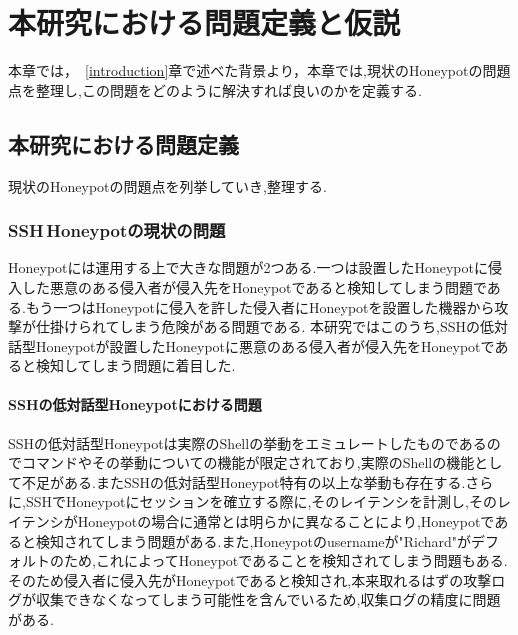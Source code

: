 \chapter{本研究における問題定義と仮説}
\label{approach}

本章では，~\ref{introduction}章で述べた背景より，本章では,現状のHoneypotの問題点を整理し,この問題をどのように解決すれば良いのかを定義する.

\section{本研究における問題定義}
\label{approach:problem}
現状のHoneypotの問題点を列挙していき,整理する.

\subsection{SSH\,Honeypotの現状の問題}
\label{approach:problemofSshHoneypot}
Honeypotには運用する上で大きな問題が2つある.一つは設置したHoneypotに侵入した悪意のある侵入者が侵入先をHoneypotであると検知してしまう問題である.もう一つはHoneypotに侵入を許した侵入者にHoneypotを設置した機器から攻撃が仕掛けられてしまう危険がある問題である.
本研究ではこのうち,SSHの低対話型Honeypotが設置したHoneypotに悪意のある侵入者が侵入先をHoneypotであると検知してしまう問題に着目した.

\subsubsection{SSHの低対話型Honeypotにおける問題}
\label{approach:problemofSshLowHoneypot}
SSHの低対話型Honeypotは実際のShellの挙動をエミュレートしたものであるのでコマンドやその挙動についての機能が限定されており,実際のShellの機能として不足がある.またSSHの低対話型Honeypot特有の以上な挙動も存在する.さらに,SSHでHoneypotにセッションを確立する際に,そのレイテンシを計測し,そのレイテンシがHoneypotの場合に通常とは明らかに異なることにより,Honeypotであると検知されてしまう問題がある.また,Honeypotのusernameが"Richard"がデフォルトのため,これによってHoneypotであることを検知されてしまう問題もある.そのため侵入者に侵入先がHoneypotであると検知され,本来取れるはずの攻撃ログが収集できなくなってしまう可能性を含んでいるため,収集ログの精度に問題がある.

\label{approach:LowHoneypotLatency}

\label{approach:LowHoneypotUsername}

